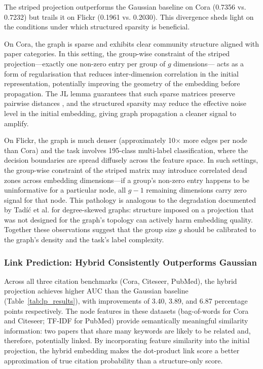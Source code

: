 \documentclass[conference]{IEEEtran}
\begin{document}
The striped projection outperforms the Gaussian baseline on Cora (0.7356
vs. 0.7232) but trails it on Flickr (0.1961 vs. 0.2030). This divergence
sheds light on the conditions under which structured sparsity is beneficial.

On Cora, the graph is sparse and exhibits clear community structure aligned
with paper categories. In this setting, the group-wise constraint of the
striped projection---exactly one non-zero entry per group of $g$ dimensions---
acts as a form of regularisation that reduces inter-dimension correlation in
the initial representation, potentially improving the geometry of the
embedding before propagation. The JL lemma guarantees that such sparse
matrices preserve pairwise distances \cite{johnson1984,achlioptas2003}, and
the structured sparsity may reduce the effective noise level in the initial
embedding, giving graph propagation a cleaner signal to amplify.

On Flickr, the graph is much denser (approximately 10$\times$ more edges
per node than Cora) and the task involves 195-class multi-label
classification, where the decision boundaries are spread diffusely across
the feature space. In such settings, the group-wise constraint of the
striped matrix may introduce correlated dead zones across embedding
dimensions---if a group's non-zero entry happens to be uninformative for a
particular node, all $g-1$ remaining dimensions carry zero signal for that
node. This pathology is analogous to the degradation documented by
Tad\'{i}\'{c} et al. \cite{tadic2024} for degree-skewed graphs: structure
imposed on a projection that was not designed for the graph's topology can
actively harm embedding quality. Together these observations suggest that
the group size $g$ should be calibrated to the graph's density and the
task's label complexity.

\subsubsection{Link Prediction: Hybrid Consistently Outperforms Gaussian}

Across all three citation benchmarks (Cora, Citeseer, PubMed), the hybrid
projection achieves higher AUC than the Gaussian baseline
(Table~\ref{tab:lp_results}), with improvements of 3.40, 3.89, and
6.87 percentage points respectively. The node features in these datasets
(bag-of-words for Cora and Citeseer; TF-IDF for PubMed) provide
semantically meaningful similarity information: two papers that share
many keywords are likely to be related and, therefore, potentially linked.
By incorporating feature similarity into the initial projection, the hybrid
embedding makes the dot-product link score a better approximation of true
citation probability than a structure-only score.
\end{document}
